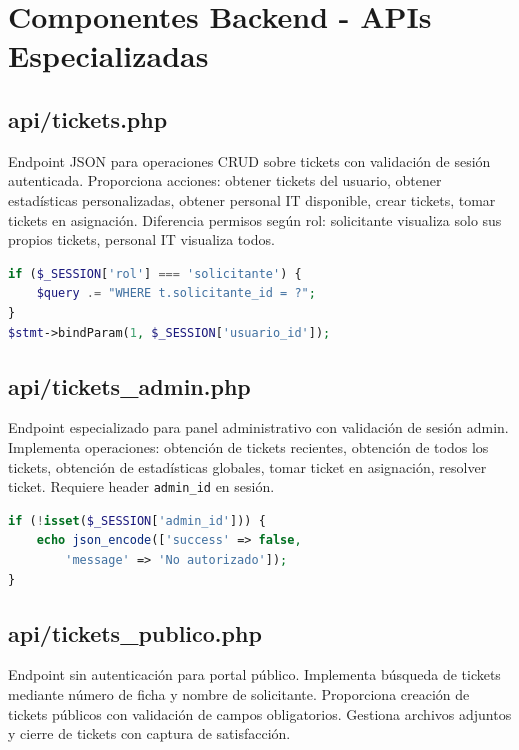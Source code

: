 \documentclass[12pt,a4paper]{article}
\begin{document}
\section{Componentes Backend - APIs Especializadas}

\subsection{api/tickets.php}

Endpoint JSON para operaciones CRUD sobre tickets con validación de sesión autenticada. Proporciona acciones: obtener tickets del usuario, obtener estadísticas personalizadas, obtener personal IT disponible, crear tickets, tomar tickets en asignación. Diferencia permisos según rol: solicitante visualiza solo sus propios tickets, personal IT visualiza todos.

\begin{lstlisting}[language=PHP,caption={Obtención de tickets por rol}]
if ($_SESSION['rol'] === 'solicitante') {
    $query .= "WHERE t.solicitante_id = ?";
}
$stmt->bindParam(1, $_SESSION['usuario_id']);
\end{lstlisting}

\subsection{api/tickets\_admin.php}

Endpoint especializado para panel administrativo con validación de sesión admin. Implementa operaciones: obtención de tickets recientes, obtención de todos los tickets, obtención de estadísticas globales, tomar ticket en asignación, resolver ticket. Requiere header \texttt{admin\_id} en sesión.

\begin{lstlisting}[language=PHP,caption={Verificación admin}]
if (!isset($_SESSION['admin_id'])) {
    echo json_encode(['success' => false, 
        'message' => 'No autorizado']);
}
\end{lstlisting}

\subsection{api/tickets\_publico.php}

Endpoint sin autenticación para portal público. Implementa búsqueda de tickets mediante número de ficha y nombre de solicitante. Proporciona creación de tickets públicos con validación de campos obligatorios. Gestiona archivos adjuntos y cierre de tickets con captura de satisfacción.
\end{document}
